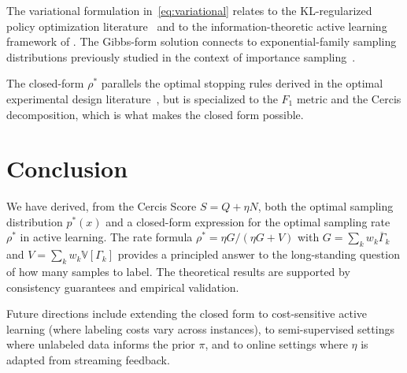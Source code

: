 \documentclass[12pt,a4paper]{article}
\newcommand{\V}{\mathbb{V}}
\begin{document}
The variational formulation in~\eqref{eq:variational} relates to the
KL-regularized policy optimization literature~\citep{levine2018reinforcement}
and to the information-theoretic active learning framework of
\citet{houlsby2011bayesian}.  The Gibbs-form solution connects to
exponential-family sampling distributions previously studied in the context
of importance sampling~\citep{liu2016stein}.

The closed-form $\rho^*$ parallels the optimal stopping rules derived in the
optimal experimental design literature~\citep{pukelsheim2006optimal}, but is
specialized to the $F_1$ metric and the Cercis decomposition, which is what
makes the closed form possible.

\section{Conclusion}

We have derived, from the Cercis Score $S=Q+\eta N$, both the optimal
sampling distribution $p^*(x)$ and a closed-form expression for the
optimal sampling rate $\rho^*$ in active learning.  The rate formula
$\rho^*=\eta G/(\eta G+V)$ with $G=\sum_k w_k\overline{\Gamma}_k$ and
$V=\sum_k w_k\V[\Gamma_k]$
provides a principled answer to the long-standing question of how many
samples to label.  The theoretical results are supported by consistency
guarantees and empirical validation.

Future directions include extending the closed form to cost-sensitive
active learning (where labeling costs vary across instances), to
semi-supervised settings where unlabeled data informs the prior $\pi$, and
to online settings where $\eta$ is adapted from streaming feedback.
\end{document}
